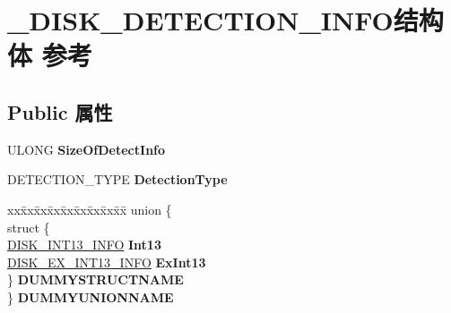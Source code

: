 \hypertarget{struct___d_i_s_k___d_e_t_e_c_t_i_o_n___i_n_f_o}{}\section{\+\_\+\+D\+I\+S\+K\+\_\+\+D\+E\+T\+E\+C\+T\+I\+O\+N\+\_\+\+I\+N\+F\+O结构体 参考}
\label{struct___d_i_s_k___d_e_t_e_c_t_i_o_n___i_n_f_o}
\subsection*{Public 属性}
\begin{DoxyCompactItemize}
\item 
\mbox{\label{struct___d_i_s_k___d_e_t_e_c_t_i_o_n___i_n_f_o_a8c7934e71b138053f6c5f9203998e178}} 
U\+L\+O\+NG {\bfseries Size\+Of\+Detect\+Info}
\item 
\mbox{\label{struct___d_i_s_k___d_e_t_e_c_t_i_o_n___i_n_f_o_a0a42747877fedc20c2ea6f81a679ca69}} 
D\+E\+T\+E\+C\+T\+I\+O\+N\+\_\+\+T\+Y\+PE {\bfseries Detection\+Type}
\item 
\mbox{\label{struct___d_i_s_k___d_e_t_e_c_t_i_o_n___i_n_f_o_a4d54245308760727081dc9de67fc053b}} 
\begin{tabbing}
xx\=xx\=xx\=xx\=xx\=xx\=xx\=xx\=xx\=\kill
union \{\\
\>struct \{\\
\>\>\hyperlink{struct___d_i_s_k___i_n_t13___i_n_f_o}{DISK\_INT13\_INFO} {\bfseries Int13}\\
\>\>\hyperlink{struct___d_i_s_k___e_x___i_n_t13___i_n_f_o}{DISK\_EX\_INT13\_INFO} {\bfseries ExInt13}\\
\>\} {\bfseries DUMMYSTRUCTNAME}\\
\} {\bfseries DUMMYUNIONNAME}\\


\end{tabbing}
\end{DoxyCompactItemize}
